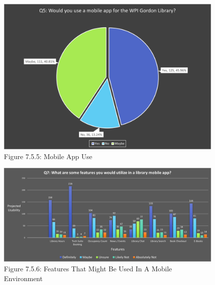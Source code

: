      \begin{figure}[H]
        \centering
        \includegraphics[width = \textwidth, height = \textheight, keepaspectratio]{assets/img/Student Survey Results Q5.png}
        \caption*{Figure 7.5.5: Mobile App Use}
    \end{figure}
       \newpage
     \begin{figure}[H]
        \hspace*{-1.9cm}
        \includegraphics[scale = .68]{assets/img/Student Survey Results Q7.png}
        \caption*{Figure 7.5.6: Features That Might Be Used In A Mobile Environment}
    \end{figure}
       \newpage
